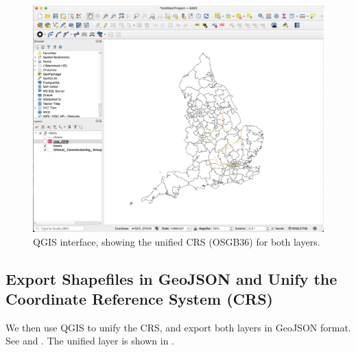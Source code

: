\documentclass[Afour,sagev,times]{sagej}
\begin{document}
{\begin{figure}[H]
    \centering
    \includegraphics[width=\columnwidth]{unify_crs.png}
    \caption{QGIS interface, showing the unified CRS (OSGB36) for both layers.}
    \label{fig:unify_crs}
\end{figure}
}

\subsection{Export Shapefiles in GeoJSON and Unify the Coordinate Reference System (CRS)}

We then use QGIS to unify the CRS, and export both layers in GeoJSON format. See  and . The unified layer is shown in .
\end{document}
